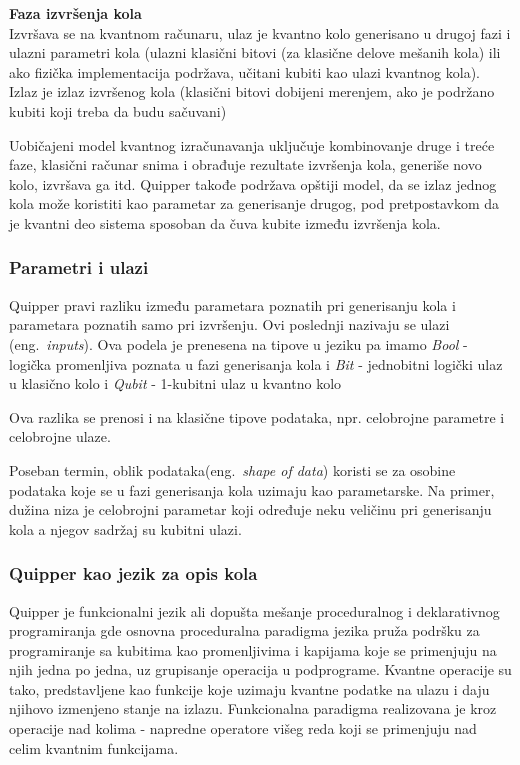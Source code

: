 \documentclass[a4paper]{article}
\begin{document}
{\textbf{Faza izvršenja kola}\\
Izvršava se na kvantnom računaru, ulaz je kvantno kolo generisano u drugoj fazi i ulazni parametri kola (ulazni klasični bitovi (za klasične delove mešanih kola) ili ako fizička implementacija podržava, učitani kubiti kao ulazi kvantnog kola). Izlaz je izlaz izvršenog kola (klasični bitovi dobijeni merenjem, ako je podržano kubiti koji treba da budu sačuvani)

Uobičajeni model kvantnog izračunavanja uključuje kombinovanje druge i treće faze, klasični računar snima i obrađuje rezultate izvršenja kola, generiše novo kolo, izvršava ga itd. Quipper takođe podržava opštiji model, da se izlaz jednog kola može koristiti kao parametar za generisanje drugog, pod pretpostavkom da je kvantni deo sistema sposoban da čuva kubite između izvršenja kola.

\subsubsection{Parametri i ulazi}

Quipper pravi razliku između parametara poznatih pri generisanju kola i parametara poznatih samo pri izvršenju. Ovi poslednji nazivaju se ulazi (eng.~\emph{inputs}). Ova podela je prenesena na tipove u jeziku pa imamo \emph{Bool} - logička promenljiva poznata u fazi generisanja kola i \emph{Bit} - jednobitni logički ulaz u klasično kolo i \emph{Qubit} - 1-kubitni ulaz u kvantno kolo

Ova razlika se prenosi i na klasične tipove podataka, npr. celobrojne parametre i celobrojne ulaze.

Poseban termin, oblik podataka(eng.~\emph{shape of data}) koristi se za osobine podataka koje se u fazi generisanja kola uzimaju kao parametarske. Na primer, dužina niza je celobrojni parametar koji određuje neku veličinu pri generisanju kola a njegov sadržaj su kubitni ulazi.

\pagebreak
\subsubsection{Quipper kao jezik za opis kola}

Quipper je funkcionalni jezik ali dopušta mešanje proceduralnog i deklarativnog programiranja gde osnovna proceduralna paradigma jezika pruža podršku za programiranje sa kubitima kao promenljivima i kapijama koje se primenjuju na njih jedna po jedna, uz grupisanje operacija u podprograme. Kvantne operacije su tako, predstavljene kao funkcije koje uzimaju kvantne podatke na ulazu i daju njihovo izmenjeno stanje na izlazu.
Funkcionalna paradigma realizovana je kroz operacije nad kolima - napredne operatore višeg reda koji se primenjuju nad celim kvantnim funkcijama.

}
\end{document}
